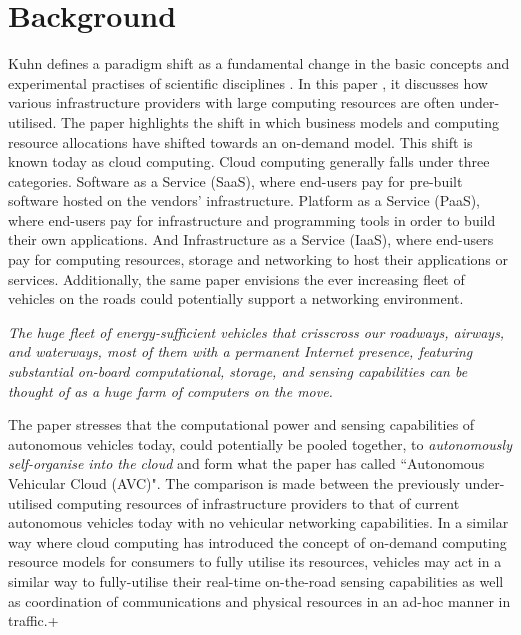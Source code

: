 \section{Background}
Kuhn defines a paradigm shift as a fundamental change in the basic concepts and experimental practises of scientific disciplines \citep{Kuhn1970TheRevolutions}. In this paper \citep{Eltoweissy2010TowardsPaper}, it discusses how various infrastructure providers with large computing resources are often under-utilised. The paper highlights the shift in which business models and computing resource allocations have shifted towards an on-demand model. This shift is known today as cloud computing. Cloud computing generally falls under three categories. Software as a Service (SaaS), where end-users pay for pre-built software hosted on the vendors' infrastructure. Platform as a Service (PaaS), where end-users pay for infrastructure and programming tools in order to build their own applications. And Infrastructure as a Service (IaaS), where end-users pay for computing resources, storage and networking to host their applications or services. Additionally, the same paper envisions the ever increasing fleet of vehicles on the roads could potentially support a networking environment.

\begin{displayquote}
    \textit{The huge fleet of energy-sufficient vehicles that crisscross our roadways, airways, and waterways, most of them with a permanent Internet presence, featuring substantial on-board computational, storage, and sensing capabilities can be thought of as a huge farm of computers on the move.}
\end{displayquote}

The paper stresses that the computational power and sensing capabilities of autonomous vehicles today, could potentially be pooled together, to \textit{autonomously self-organise into the cloud} and form what the paper has called ``Autonomous Vehicular Cloud (AVC)". The comparison is made between the previously under-utilised computing resources of infrastructure providers to that of current autonomous vehicles today with no vehicular networking capabilities. In a similar way where cloud computing has introduced the concept of on-demand computing resource models for consumers to fully utilise its resources, vehicles may act in a similar way to fully-utilise their real-time on-the-road sensing capabilities as well as coordination of communications and physical resources in an ad-hoc manner in traffic.+